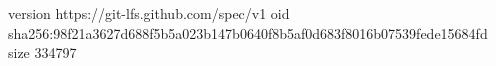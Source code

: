 version https://git-lfs.github.com/spec/v1
oid sha256:98f21a3627d688f5b5a023b147b0640f8b5af0d683f8016b07539fede15684fd
size 334797
